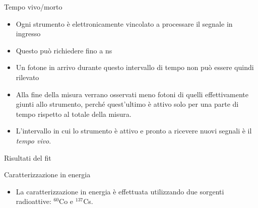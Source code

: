 \documentclass [xcolor=svgnames, 9pt] {beamer}
\begin{document}
\begin{frame}[noframenumbering]{Tempo vivo/morto}
	\begin{itemize}
		\item Ogni strumento è elettronicamente vincolato a processare il segnale in ingresso
		\item Questo può richiedere fino a ns
		\item Un fotone in arrivo durante questo intervallo di tempo non può essere quindi rilevato
		\item Alla fine della misura verrano osservati meno fotoni di quelli effettivamente giunti allo strumento, perché quest'ultimo è attivo solo per una parte di tempo rispetto al totale della misura.
		\item L'intervallo in cui lo strumento è attivo e pronto a ricevere nuovi segnali è il \emph{tempo vivo}.
	\end{itemize}
\end{frame}
\begin{frame}[noframenumbering]{Risultati del fit}
	\begin{table}[ht]
		\centering
	\end{table}
\end{frame}	

\begin{frame}[noframenumbering]{Caratterizzazione in energia}
	\begin{itemize}
			\item La caratterizzazione in energia è effettuata utilizzando due sorgenti radioattive: $^{60}$Co e $^{137}$Cs.
		\end{itemize}
\end{frame}
\end{document}

